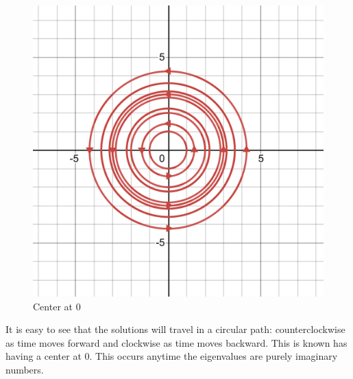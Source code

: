 \begin{figure}[h]
    \centering
    \includegraphics[scale=0.35]{Images/center.png}
    \caption{Center at 0}
    \label{fig:center}
\end{figure}

It is easy to see that the solutions will travel in a circular path: counterclockwise as time moves forward and clockwise as time moves backward. This is known has having a center at 0. This occurs anytime the eigenvalues are purely imaginary numbers.\\

